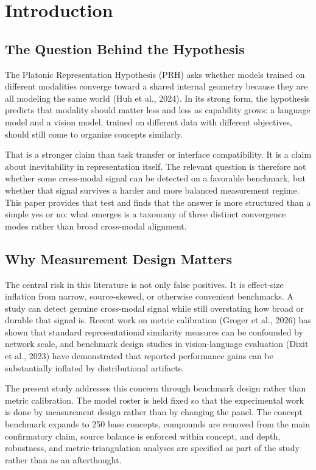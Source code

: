 \documentclass[11pt,a4paper]{article}
\begin{document}
\section{Introduction}\label{introduction}

\subsection{The Question Behind the
Hypothesis}\label{the-question-behind-the-hypothesis}

The Platonic Representation Hypothesis (PRH) asks whether models trained
on different modalities converge toward a shared internal geometry
because they are all modeling the same world (Huh et al., 2024). In its
strong form, the hypothesis predicts that modality should matter less
and less as capability grows: a language model and a vision model,
trained on different data with different objectives, should still come
to organize concepts similarly.

That is a stronger claim than task transfer or interface compatibility.
It is a claim about inevitability in representation itself. The relevant
question is therefore not whether some cross-modal signal can be
detected on a favorable benchmark, but whether that signal survives a
harder and more balanced measurement regime. This paper provides that
test and finds that the answer is more structured than a simple yes or
no: what emerges is a taxonomy of three distinct convergence modes
rather than broad cross-modal alignment.

\subsection{Why Measurement Design
Matters}\label{why-measurement-design-matters}

The central risk in this literature is not only false positives. It is
effect-size inflation from narrow, source-skewed, or otherwise
convenient benchmarks. A study can detect genuine cross-modal signal
while still overstating how broad or durable that signal is. Recent work
on metric calibration (Groger et al., 2026) has shown that standard
representational similarity measures can be confounded by network scale,
and benchmark design studies in vision-language evaluation (Dixit et
al., 2023) have demonstrated that reported performance gains can be
substantially inflated by distributional artifacts.

The present study addresses this concern through benchmark design rather
than metric calibration. The model roster is held fixed so that the
experimental work is done by measurement design rather than by changing
the panel. The concept benchmark expands to 250 base concepts, compounds
are removed from the main confirmatory claim, source balance is enforced
within concept, and depth, robustness, and metric-triangulation analyses
are specified as part of the study rather than as an afterthought.
\end{document}
